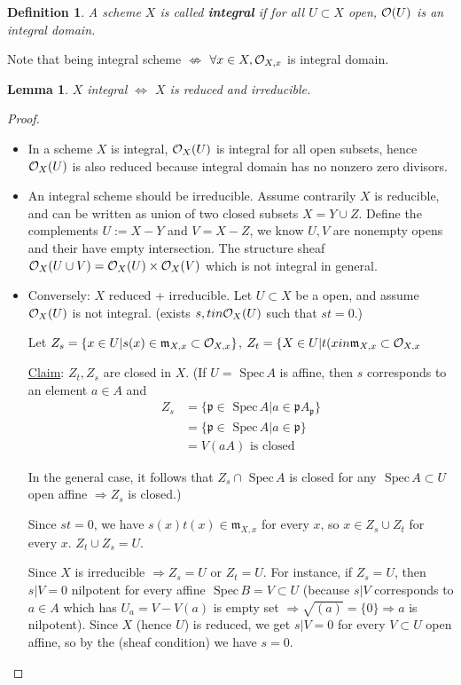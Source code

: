 \documentclass[11pt]{article}
\newtheorem{lemma}[thm]{Lemma}
\newtheorem{dfn}[thm]{Definition}
\newcommand{\spec}{\text{ Spec}\,}
\newcommand{\scm}{{\mathfrak m}}
\newcommand{\scp}{{\mathfrak p}}
\newcommand{\calo}{{\cal O}}
\newcommand{\Lrta}{\Longrightarrow}
\newcommand{\Llrta}{\Longleftrightarrow}
\begin{document}
\begin{dfn}
A scheme $X$ is called \textbf{integral} if for all $U\subset X$ open, $\calo(U)$ is an integral domain.
\end{dfn}
Note that being integral scheme $\not \Llrta$ $\forall x\in X,\calo_{X,x} $ is integral domain.
\begin{lemma}
$X$ integral $\Llrta$ $X$ is reduced and irreducible.
\end{lemma}
\begin{proof}
\begin{itemize}
\item In a scheme $X$ is integral, $\calo_X(U)$ is integral for all open subsets, hence $\calo_X(U)$ is also reduced because integral domain has no nonzero zero divisors.

\item An integral scheme should be irreducible. Assume contrarily $X$ is reducible, and can be written as union of two closed subsets $X=Y\cup Z$. Define the complements $U:=X-Y$ and $V=X-Z$, we know $U,V$ are nonempty opens and their have empty intersection. The structure sheaf $\calo_X(U\cup V)=\calo_X(U)\times \calo_X(V)$ which is not integral in general.
\item Conversely: $X$ reduced + irreducible. Let $U\subset X$ be a open, and assume $\calo_X(U)$ is not integral. (exists $s,tin\calo_X(U)$ such that $st=0$.)

Let $Z_s=\{x\in U| s(x)\in\scm_{X,x}\subset \calo_{X,x}\}$, $Z_t=\{X\in U|t(x\\in\scm_{X,x}\subset \calo_{X,x}$

\underline{Claim}: $Z_t,Z_s$ are closed in $X$. (If $U=\spec A$ is affine, then $s$ corresponds to an element $a\in A$ and
$$
\begin{aligned}
Z_s&=\{\scp\in\spec A| a\in\scp A_\scp\}\\
&=\{\scp\in\spec A|a\in\scp\}\\
&=V(a A)\text{ is  closed}
\end{aligned}
$$

In the general case, it follows that $Z_s\cap \spec A$ is closed for any $\spec A\subset U$ open affine $\Lrta Z_s$ is closed.)

Since $st=0$, we have $s(x)t(x)\in\scm_{X,x}$ for every $x$, so $x\in Z_s\cup Z_t$ for every $x$. $Z_t\cup Z_s=U$.

Since $X$ is irreducible $\Lrta Z_s=U$ or $Z_t=U$. For instance, if $Z_s=U$, then $s|V=0$ nilpotent for every affine $\spec B=V\subset U$ (because $s|V$ corresponds to $a\in A$ which has $U_a=V-V(a)$ is empty set $\Lrta \sqrt{(a)}=\{0\}\Lrta a$ is nilpotent). Since $X$ (hence $U$) is reduced, we get $s|V=0$ for every $V\subset U$ open affine, so by the (sheaf condition) we have $s=0$.
\end{itemize}
\end{proof}
\end{document}
